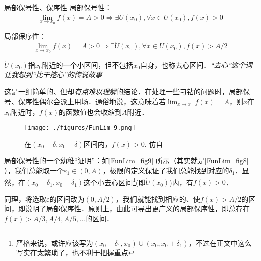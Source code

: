 \begin{theorem}{局部保号性、保序性}
局部保号性：
\begin{equation}
\lim_{x\to x_0}f(x)=A>0\Rightarrow \exists \mathring{U} (x_0), \forall x \in U(x_0), f(x)>0
\end{equation}

局部保序性：
\begin{equation}
\lim_{x\to x_0}f(x)=A>0 \Rightarrow \exists \mathring{U} (x_0), \forall x \in U(x_0), f(x)>A/2
\end{equation}

$\mathring{U} (x_0)$指$x_0$附近的一个小区间，但不包括$x_0$自身，也称去心区间．\textsl{“去心”这个词让我想到“比干挖心”的传说故事}

这是一组简单的、但却\textsl{有点难以理解}的结论．在处理一些刁钻的问题时，局部保号、保序性偶尔会派上用场．通俗地说，这意味着若$\lim_{x\to x_0}f(x)=A$，则$x$在$x_0$附近时，$f(x)$的函数值也会收缩到$A$附近．

\begin{figure}[ht]
\centering
\texttt{[image: ./figures/FunLim\_9.png]}
\caption{在$(x_0-\delta, x_0+\delta)$区间内，$f(x)>0$. 仿自\cite{Thomas}} \label{FunLim_fig9}
\end{figure}
局部保号性的一个幼稚“证明”：如\autoref{FunLim_fig9} 所示（其实就是\autoref{FunLim_fig8} ），我们总能取一个$\varepsilon_1 \in (0,A)$，极限的定义保证了我们总能找到对应的$\delta_1$．显然，在$(x_0-\delta_1, x_0+\delta_1)$这个小去心区间\footnote{严格来说，或许应该写为$(x_0-\delta_1,x_0)\cup(x_0, x_0+\delta_1)$，不过在正文中这么写实在太繁琐了，也不利于把握重点}(即$\mathring{U} ({x_0})$)内，有$f(x)>0$．

同理，将选取$\varepsilon$的区间改为$(0,A/2)$，我们就能找到相应的、使$f(x)>A/2$的区间，即说明了局部保序性．原则上，由此可导出更广义的局部保序性，即总存在$f(x)>A/3,A/4,A/5,...$的区间．

\end{theorem}